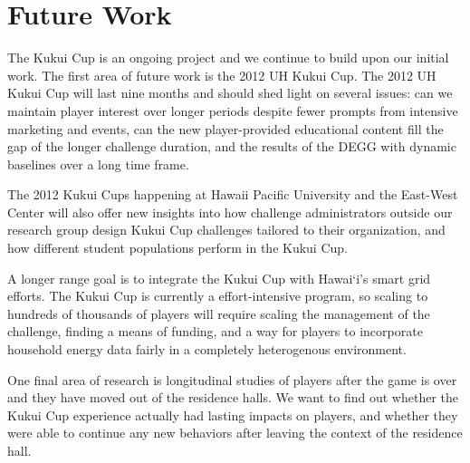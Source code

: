 \documentclass[10pt, conference, compsocconf]{IEEEtran}
\newcommand{\Hawaii}{Hawai`i\xspace}
\begin{document}
%


\section{Future Work}

The Kukui Cup is an ongoing project and we continue to build upon our initial work. The first area of future work is the 2012 UH Kukui Cup. The 2012 UH Kukui Cup will last nine months and should shed light on several issues: can we  maintain player interest over longer periods despite fewer prompts from intensive marketing and events, can the new player-provided educational content fill the gap of the longer challenge duration, and the results of the DEGG with dynamic baselines over a long time frame.

The 2012 Kukui Cups happening at Hawaii Pacific University and the East-West Center will also offer new insights into how challenge administrators outside our research group design Kukui Cup challenges tailored to their organization, and how different student populations perform in the Kukui Cup.


A longer range goal is to integrate the Kukui Cup with \Hawaii's smart grid efforts. The Kukui Cup is currently a effort-intensive program, so scaling to hundreds of thousands of players will require scaling the management of the challenge, finding a means of funding, and a way for players to incorporate household energy data fairly in a completely heterogenous environment.

One final area of research is longitudinal studies of players after the game is over and they have moved out of the residence halls. We want to find out whether the Kukui Cup experience actually had lasting impacts on players, and whether they were able to continue any new behaviors after leaving the context of the residence hall.
\end{document}
